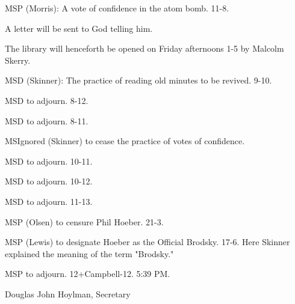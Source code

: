 \documentclass[12pt]{article}
\begin{document}
MSP (Morris): A vote of confidence in the atom bomb. 11-8.

A letter will be sent to God telling him.

The library will henceforth be opened on Friday afternoons 1-5 by Malcolm Skerry.

MSD (Skinner): The practice of reading old minutes to be revived. 9-10.

MSD to adjourn. 8-12.

MSD to adjourn. 8-11.

MSIgnored (Skinner) to cease the practice of votes of confidence.

MSD to adjourn. 10-11.

MSD to adjourn. 10-12.

MSD to adjourn. 11-13.

MSP (Olsen) to censure Phil Hoeber. 21-3.

MSP (Lewis) to designate Hoeber as the Official Brodsky. 17-6. Here Skinner explained the meaning of the term "Brodsky."

MSP to adjourn. 12+Campbell-12. 5:39 PM.

\vspace{12pt}

\centerline{Douglas John Hoylman, Secretary}
\end{document}
